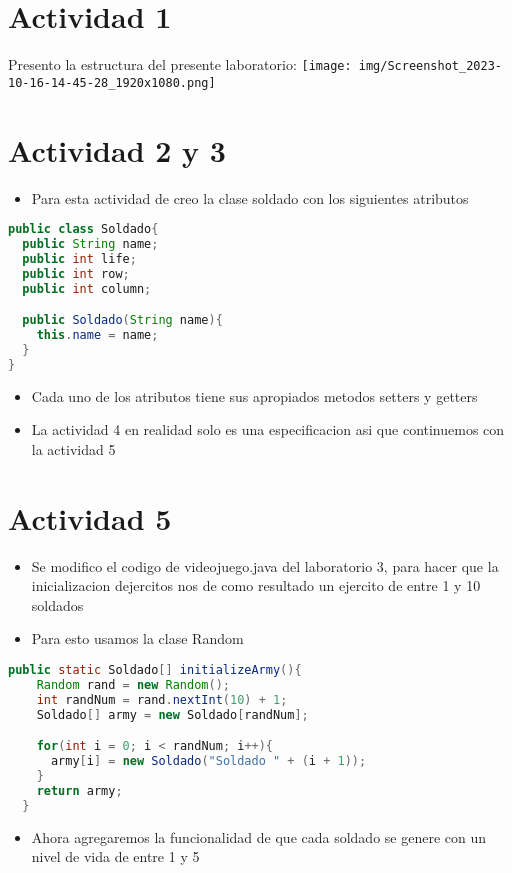 \section{Actividad 1}
Presento la estructura del presente laboratorio:
  \centering
  \texttt{[image: img/Screenshot\_2023-10-16-14-45-28\_1920x1080.png]}
\section{Actividad 2 y 3}
    \begin{itemize}
        \item Para esta actividad de creo la clase soldado con los siguientes atributos
    \end{itemize}
\begin{lstlisting}[language=java, caption={Clase Soldado.java}]
public class Soldado{
  public String name;
  public int life;
  public int row;
  public int column;

  public Soldado(String name){
    this.name = name;
  }
}
\end{lstlisting}
\begin{itemize}
    \item Cada uno de los atributos tiene sus apropiados metodos setters y getters
    \item La actividad 4 en realidad solo es una especificacion asi que continuemos con la actividad 5
\end{itemize}
\section{Actividad 5}
\begin{itemize}
    \item Se modifico el codigo de videojuego.java del laboratorio 3, para hacer que la inicializacion dejercitos nos de como resultado un ejercito de entre 1 y 10 soldados
    \item Para esto usamos la clase Random 
    \end{itemize}
    \begin{lstlisting}[language=java, caption={Clase Videojuego.java}]
  public static Soldado[] initializeArmy(){
    Random rand = new Random();
    int randNum = rand.nextInt(10) + 1;
    Soldado[] army = new Soldado[randNum];

    for(int i = 0; i < randNum; i++){
      army[i] = new Soldado("Soldado " + (i + 1));
    }
    return army;
  }
\end{lstlisting}
\begin{itemize}
    \item Ahora agregaremos la funcionalidad de que cada soldado se genere con un nivel de vida de entre 1 y 5
\end{itemize}

